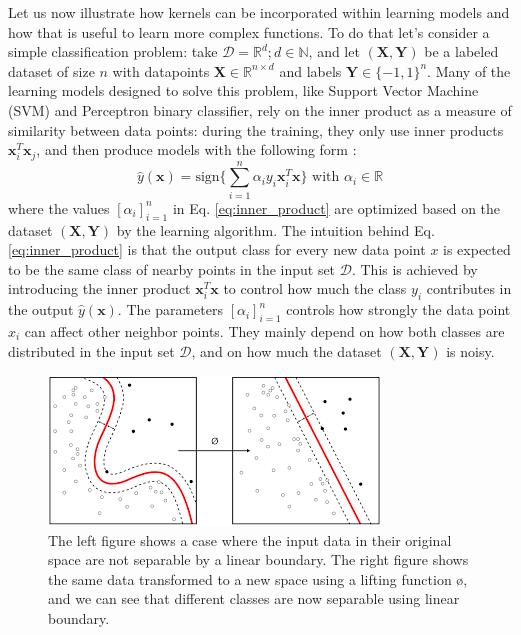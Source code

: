 Let us now illustrate how kernels can be incorporated within learning models and how that is useful to learn more complex functions. To do that let's consider a simple classification problem: take $\mathcal{D}=\mathbb{R}^d; d\in\mathbb{N}$, and let $(\mathbf{X},\mathbf{Y})$ be a labeled dataset of size $n$ with datapoints $\mathbf{X}\in \mathbb{R}^{n\times d} $ and labels $\mathbf{Y}\in \{-1,1\}^n$. Many of the learning models designed to solve this problem, like Support Vector Machine (SVM) and Perceptron binary classifier, rely on the inner product as a measure of similarity between data points: during the training, they only use inner products $\mathbf{x}_i^T \mathbf{x}_j$, and then produce models with the following form \citep{inner_product}:
\begin{equation}
\label{eq:inner_product}
 \hat{y}(\mathbf{x})=\text{sign}\{\sum_{i=1}^n\alpha_iy_i\mathbf{x}_i^T\mathbf{x}\} \text{ with } \alpha_i\in \mathbb{R}
\end{equation}
where the values $[\alpha_i]_{i=1}^n$ in Eq. \ref{eq:inner_product} are optimized based on the dataset $(\mathbf{X,Y})$ by the learning algorithm. The intuition behind Eq. \ref{eq:inner_product} is that the output class for every new data point $x$ is expected to be the same class of nearby points in the input set $\mathcal{D}$. This is achieved by introducing the inner product $\mathbf{x}_i^T\mathbf{x}$ to control how much the class $y_i$ contributes in the output $\hat{y}(\mathbf{x})$. The parameters $[\alpha_i]_{i=1}^n$ controls how strongly the data point $x_i$ can affect other neighbor points. They mainly depend on how both classes are distributed in the input set $\mathcal{D}$, and on how much the dataset $(\mathbf{X,Y})$ is noisy. 

\begin{figure}[H]
\centering
\includegraphics[scale=0.5]{figs/svm.png}
\caption[The case where classes aren't separable using linear boundary]{The left figure shows a case where the input data in their original space are not separable by a linear boundary. The right figure shows the same data transformed to a new space using a lifting function \o, and we can see that different classes are now separable  using linear boundary.}
\label{fig:SVM_boundaries}
\end{figure}

